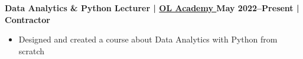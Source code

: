 \textbf{Data Analytics \& Python Lecturer | 
\href{https://olacademy.ge/user-public-account/85}{
    {OL Academy} 
} \hfill May 2022--Present | Contractor}

\begin{itemize}[label=$\bullet$]
    \item Designed and created a course about Data Analytics with Python from scratch
\end{itemize}\par